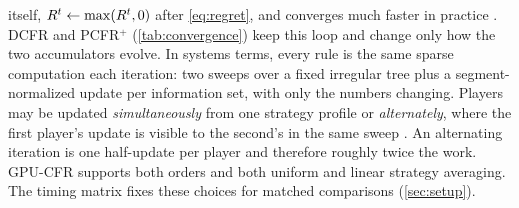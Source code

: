 itself, $R^{t}\gets\max(R^{t},0)$ after \cref{eq:regret}, and
converges much faster in practice \cite{tammelin2015solving,burch2019revisiting}. DCFR \cite{brown2019solving} and PCFR$^{+}$
\cite{farina2021faster} (\cref{tab:convergence}) keep this loop and change only how
the two accumulators evolve. In systems terms, every rule is the same sparse computation each iteration: two
sweeps over a fixed irregular tree plus a segment-normalized update per information
set, with only the numbers changing. Players may be updated \emph{simultaneously}
from one strategy profile or \emph{alternately}, where the first player's update is
visible to the second's in the same sweep \cite{burch2019revisiting}. An alternating
iteration is one half-update per player and therefore roughly twice the work. GPU-CFR
supports both orders and both uniform and linear strategy averaging. The timing
matrix fixes these choices for matched comparisons (\cref{sec:setup}).
